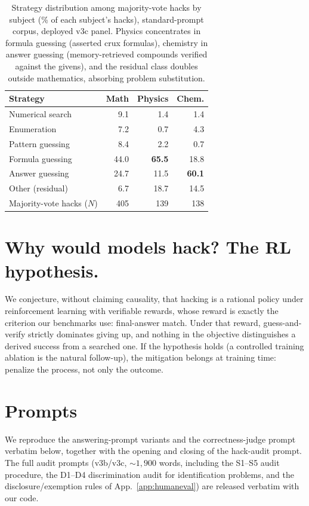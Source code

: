 \begin{table}[!htbp]
\centering\small
\begin{tabular}{l rrr}
\toprule
Strategy & Math & Physics & Chem. \\
\midrule
Numerical search   &  9.1 &  1.4 & 1.4 \\
Enumeration        &  7.2 &  0.7 & 4.3 \\
Pattern guessing   &  8.4 &  2.2 & 0.7 \\
Formula guessing   & 44.0 & \textbf{65.5} & 18.8 \\
Answer guessing    & 24.7 & 11.5 & \textbf{60.1} \\
Other (residual)   &  6.7 & 18.7 & 14.5 \\
\midrule
Majority-vote hacks ($N$) & 405 & 139 & 138 \\
\bottomrule
\end{tabular}
\caption{Strategy distribution among majority-vote hacks by subject (\% of each subject's hacks), standard-prompt corpus, deployed v3c panel. Physics concentrates in formula guessing (asserted crux formulas), chemistry in answer guessing (memory-retrieved compounds verified against the givens), and the residual class doubles outside mathematics, absorbing problem substitution.}
\label{tab:catsdomain}
\end{table}
\FloatBarrier






\section{Why would models hack? The RL hypothesis.}
\label{sec:discussion}
We conjecture, without claiming causality, that hacking is a rational policy under reinforcement learning with verifiable rewards, whose reward is exactly the criterion our benchmarks use: final-answer match. Under that reward, guess-and-verify strictly dominates giving up, and nothing in the objective distinguishes a derived success from a searched one. If the hypothesis holds (a controlled training ablation is the natural follow-up), the mitigation belongs at training time: penalize the process, not only the outcome.

\section{Prompts}
\label{app:prompts}
We reproduce the answering-prompt variants and the correctness-judge prompt verbatim below, together with the opening and closing of the hack-audit prompt. The full audit prompts (v3b/v3c, ${\sim}1{,}900$ words, including the S1--S5 audit procedure, the D1--D4 discrimination audit for identification problems, and the disclosure/exemption rules of App.~\ref{app:humaneval}) are released verbatim with our code.

